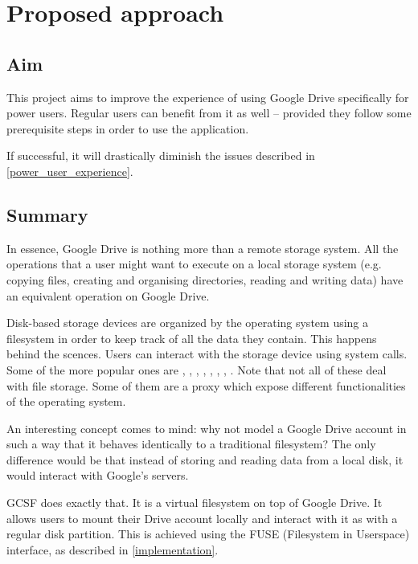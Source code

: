 \chapter{Proposed approach}

\section{Aim}

This project aims to improve the experience of using Google Drive specifically for power users. Regular users can benefit from it as well -- provided they follow some prerequisite steps in order to use the application.

If successful, it will drastically diminish the issues described in \ref{power_user_experience}.

\section{Summary}

In essence, Google Drive is nothing more than a remote storage system. All the operations that a user might want to execute on a local storage system (e.g. copying files, creating and organising directories, reading and writing data) have an equivalent operation on Google Drive.

Disk-based storage devices are organized by the operating system using a filesystem in order to keep track of all the data they contain. This happens behind the scences. Users can interact with the storage device using system calls. Some of the more popular ones are , , , , , , , . Note that not all of these deal with file storage. Some of them are a proxy which expose different functionalities of the operating system.

An interesting concept comes to mind: why not model a Google Drive account in such a way that it behaves identically to a traditional filesystem? The only difference would be that instead of storing and reading data from a local disk, it would interact with Google's servers.

GCSF does exactly that. It is a virtual filesystem on top of Google Drive. It allows users to mount their Drive account locally and interact with it as with a regular disk partition. This is achieved using the FUSE (Filesystem in Userspace) interface\cite{libfuse}, as described in \ref{implementation}.

